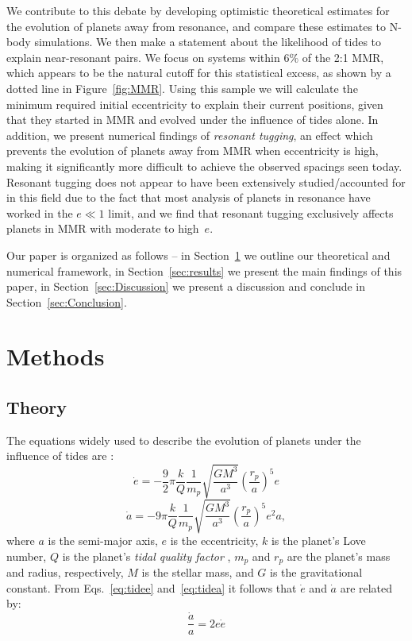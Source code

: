 We contribute to this debate by developing optimistic theoretical estimates for the evolution of planets away from resonance, and compare these estimates to N-body simulations. 
We then make a statement about the likelihood of tides to explain near-resonant pairs. 
We focus on \kep{} systems within $6\%$ of the 2:1 MMR, which appears to be the natural cutoff for this statistical excess, as shown by a dotted line in Figure~\ref{fig:MMR}. 
Using this sample we will calculate the minimum required initial eccentricity to explain their current positions, given that they started in MMR and evolved under the influence of tides alone. 
In addition, we present numerical findings of {\it resonant tugging}, an effect which prevents the evolution of planets away from MMR when eccentricity is high, making it significantly more difficult to achieve the observed spacings seen today. 
Resonant tugging does not appear to have been extensively studied/accounted for in this field due to the fact that most analysis of planets in resonance have worked in the $e \ll 1$ limit, and we find that resonant tugging exclusively affects planets in MMR with moderate to high~$e$. 

Our paper is organized as follows -- in Section~\ref{sec:meth} we outline our theoretical and numerical framework, in Section~\ref{sec:results} we present the main findings of this paper, in Section~\ref{sec:Discussion} we present a discussion and conclude in Section~\ref{sec:Conclusion}.

\section{Methods}
\label{sec:meth}
\subsection{Theory}
\label{sec: Theory}
The equations widely used to describe the evolution of planets under the influence of tides are \citep[e.g.][]{Barnes2008, LithwickWu2012,Lee2013}:
\begin{equation}
\dot{e} = -\frac{9}{2}\pi \frac{k}{Q} \frac{1}{m_p} \sqrt{\frac{GM^3}{a^3}} \left(\frac{r_p}{a} \right)^5 e
\label{eq:tidee}
\end{equation}
\begin{equation}
\dot{a} = -9\pi \frac{k}{Q} \frac{1}{m_p} \sqrt{\frac{GM^3}{a^3}} \left(\frac{r_p}{a} \right)^5 e^2 a,
\label{eq:tidea}
\end{equation}
where $a$ is the semi-major axis, $e$ is the eccentricity, $k$ is the planet's Love number, $Q$ is the planet's \textit{tidal quality factor} \citep{Goldreich1966}, $m_p$ and $r_p$ are the planet's mass and radius, respectively, $M$ is the stellar mass, and $G$ is the gravitational constant. 
From Eqs.~\ref{eq:tidee} and~\ref{eq:tidea} it follows that $\dot{e}$ and $\dot{a}$ are related by:
\begin{equation}
\frac{\dot{a}}{a} = 2e\dot{e}
\label{eq:LiWu}
\end{equation}

